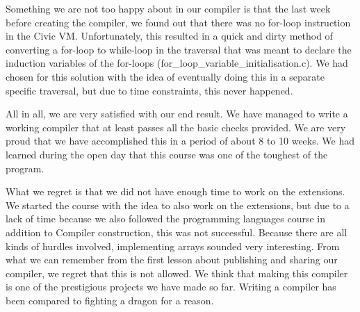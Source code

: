 \documentclass{uva-inf-article}
\begin{document}
Something we are not too happy about in our compiler is that the last week before creating the compiler, we found out that there was no for-loop instruction in the Civic VM. 
Unfortunately, this resulted in a quick and dirty method of converting a for-loop to while-loop in the traversal that was meant to declare the induction variables of the for-loops 
(for\_loop\_variable\_initialisation.c). 
We had chosen for this solution with the idea of eventually doing this in a separate specific traversal, 
but due to time constraints, this never happened.

All in all, we are very satisfied with our end result. 
We have managed to write a working compiler that at least passes all the basic checks provided. 
We are very proud that we have accomplished this in a period of about 8 to 10 weeks. 
We had learned during the open day that this course was one of the toughest of the program.

What we regret is that we did not have enough time to work on the extensions. 
We started the course with the idea to also work on the extensions, but due to a lack of time 
because we also followed the programming languages course in addition to Compiler construction, this was not successful.
Because there are all kinds of hurdles involved, implementing arrays sounded very interesting.
From what we can remember from the first lesson about publishing and sharing our compiler, 
we regret that this is not allowed. We think that making this compiler is one of the prestigious projects we have made so far. 
Writing a compiler has been compared to fighting a dragon for a reason.
\end{document}
